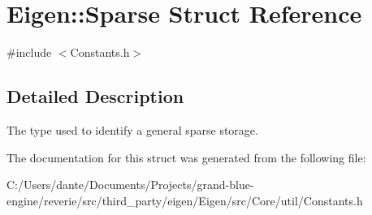 \hypertarget{struct_eigen_1_1_sparse}{}\section{Eigen\+::Sparse Struct Reference}
\label{struct_eigen_1_1_sparse}


{\ttfamily \#include $<$Constants.\+h$>$}



\subsection{Detailed Description}
The type used to identify a general sparse storage. 

The documentation for this struct was generated from the following file\+:\begin{DoxyCompactItemize}
\item 
C\+:/\+Users/dante/\+Documents/\+Projects/grand-\/blue-\/engine/reverie/src/third\+\_\+party/eigen/\+Eigen/src/\+Core/util/Constants.\+h\end{DoxyCompactItemize}
